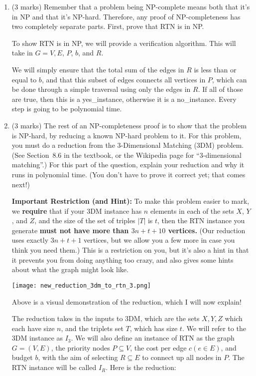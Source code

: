 \documentclass[11pt]{article}
\begin{document}
\begin{enumerate}
\item (3 marks)
Remember that a problem being NP-complete means both that it's in NP
and that it's NP-hard.  Therefore, any proof of NP-completeness has
two completely separate parts.  First, prove that RTN is in NP.

\begin{soln}
To show RTN is in NP, we will provide a verification algorithm. This will take in $G={V,E}$, $P$, $b$, and $R$.

We will simply ensure that the total sum of the edges in $R$ is less than or equal to $b$, and that this subset of edges connects all vertices in $P$, which can be done through a simple traversal using only the edges in $R$. If all of those are true, then this is a yes\_instance, otherwise it is a no\_instance. Every step is going to be polynomial time.


\end{soln}
\newpage
\item (3 marks)
The rest of an NP-completeness proof is to show that the problem is
NP-hard, by reducing a known NP-hard problem to it.
For this problem, you must do a reduction from the 3-Dimensional Matching
(3DM) problem.  (See Section~8.6 in the textbook, or the Wikipedia page
for ``3-dimensional matching''.)
For this part of the question, explain your reduction and why it runs
in polynomial time.  (You don't have to prove it correct yet; that comes
next!)

\textbf{Important Restriction (and Hint):}
To make this problem easier to mark, we \textbf{require} that
if your 3DM instance has $n$ elements in each of the sets $X$, $Y$, and $Z$,
and the size of the set of triples $|T|$ is $t$, then the RTN instance
you generate \textbf{must not have more than $3n+t+10$ vertices.}
(Our reduction uses exactly $3n+t+1$ vertices, but we allow you a few more
in case you think you need them.)  This is a restriction on you, but it's
also a hint in that it prevents you from doing anything too crazy, and
also gives some hints about what the graph might look like.

\begin{soln}
\texttt{[image: new\_reduction\_3dm\_to\_rtn\_3.png]}

Above is a visual demonstration of the reduction, which I will now explain!

The reduction takes in the inputs to 3DM, which are the sets $X,Y,Z$ which each have size $n$, and the triplets set $T$, which has size $t$. We will refer to the 3DM instance as $I_3$. We will also define an instance of RTN as the graph $G=(V,E)$, the priority nodes $P\subseteq V$, the cost per edge $c(e \in E)$, and budget $b$, with the aim of selecting $R \subseteq E$ to connect up all nodes in $P$. The RTN instance will be called $I_R$. Here is the reduction:


\end{soln}
\end{enumerate}
\end{document}
